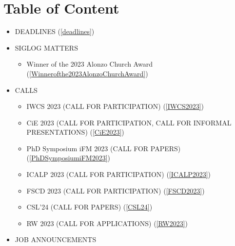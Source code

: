 \documentclass[prodmode,acmtecs]{acmsmall} %
\begin{document}
\section{Table of Content}\begin{itemize}\item DEADLINES (\cref{deadlines}) 
 
\item SIGLOG MATTERS 
 
\begin{itemize}\item Winner of the 2023 Alonzo Church Award (\cref{Winnerofthe2023AlonzoChurchAward})
\end{itemize} 
\item CALLS 
 
\begin{itemize}\item IWCS 2023 (CALL FOR PARTICIPATION) (\cref{IWCS2023})
\item CiE 2023 (CALL FOR PARTICIPATION, CALL FOR INFORMAL PRESENTATIONS) (\cref{CiE2023})
\item PhD Symposium iFM 2023 (CALL FOR PAPERS) (\cref{PhDSymposiumiFM2023})
\item ICALP 2023 (CALL FOR PARTICIPATION) (\cref{ICALP2023})
\item FSCD 2023 (CALL FOR PARTICIPATION) (\cref{FSCD2023})
\item CSL'24 (CALL FOR PAPERS) (\cref{CSL24})
\item RW 2023 (CALL FOR APPLICATIONS) (\cref{RW2023})
\end{itemize} 
\item JOB ANNOUNCEMENTS 
 

\end{itemize}
\end{document}
